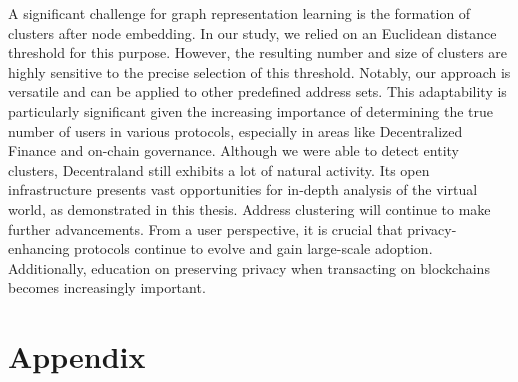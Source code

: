 \documentclass[12pt,a4paper,titlepage,oneside,english]{article}
\begin{document}
A significant challenge for graph representation learning is the formation of clusters after node embedding. In our study, we relied on an Euclidean distance threshold for this purpose. However, the resulting number and size of clusters are highly sensitive to the precise selection of this threshold. \newline
Notably, our approach is versatile and can be applied to other predefined address sets. This adaptability is particularly significant given the increasing importance of determining the true number of users in various protocols, especially in areas like Decentralized Finance and on-chain governance. \newline
Although we were able to detect entity clusters, Decentraland still exhibits a lot of natural activity. Its open infrastructure presents vast opportunities for in-depth analysis of the virtual world, as demonstrated in this thesis. \newline
Address clustering will continue to make further advancements. From a user perspective, it is crucial that privacy-enhancing protocols continue to evolve and gain large-scale adoption. Additionally, education on preserving privacy when transacting on blockchains becomes increasingly important.



\newpage
\setcounter{page}{1}
\onehalfspacing
{}



\section{Appendix}


\end{document}
